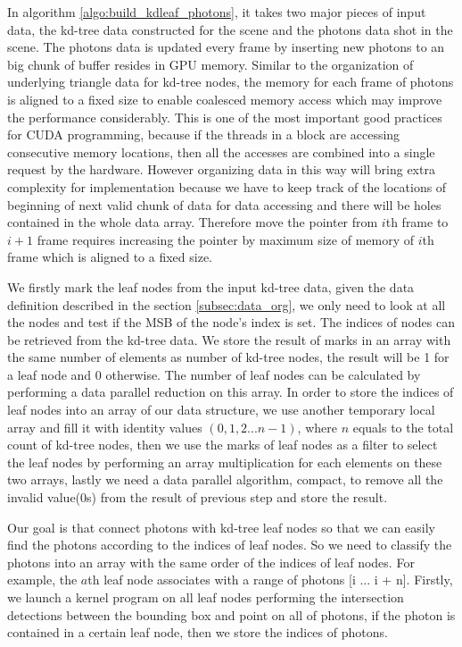 \vspace{30pt}

In algorithm \ref{algo:build_kdleaf_photons}, it takes two major pieces of input data, the kd-tree data constructed for the scene and the photons data shot in the scene. The photons data is updated every frame by inserting new photons to an big chunk of buffer resides in GPU memory. Similar to the organization of underlying triangle data for kd-tree nodes, the memory for each frame of photons is aligned to a fixed size to enable coalesced memory access which may improve the performance considerably. This is one of the most important good practices for CUDA programming, because if the threads in a block are accessing consecutive memory locations, then all the accesses are combined into a single request by the hardware. However organizing data in this way will bring extra complexity for implementation because we have to keep track of the locations of beginning of next valid chunk of data for data accessing and there will be holes contained in the whole data array. Therefore move the pointer from \(i\)th frame to \(i+1\) frame requires increasing the pointer by maximum size of memory of \(i\)th frame which is aligned to a fixed size. 

We firstly mark the leaf nodes from the input kd-tree data, given the data definition described in the section \ref{subsec:data_org}, we only need to look at all the nodes and test if the MSB of the node's index is set. The indices of nodes can be retrieved from the kd-tree data. We store the result of marks in an array with the same number of elements as number of kd-tree nodes, the result will be 1 for a leaf node and 0 otherwise. The number of leaf nodes can be calculated by performing a data parallel reduction on this array. In order to store the indices of leaf nodes into an array of our data structure, we use another temporary local array and fill it with identity values \( (0, 1, 2 ... n-1) \), where \(n\) equals to the total count of kd-tree nodes, then we use the marks of leaf nodes as a filter to select the leaf nodes by performing an array multiplication for each elements on these two arrays, lastly we need a data parallel algorithm, compact, to remove all the invalid value(0s) from the result of previous step and store the result. 

Our goal is that connect photons with kd-tree leaf nodes so that we can easily find the photons according to the indices of leaf nodes. So we need to classify the photons into an array with the same order of the indices of leaf nodes. For example, the \(a\)th leaf node associates with a range of photons [i ... i + n]. Firstly, we launch a kernel program on all leaf nodes performing the intersection detections between the bounding box and point on all of photons, if the photon is contained in a certain leaf node, then we store the indices of photons. 

